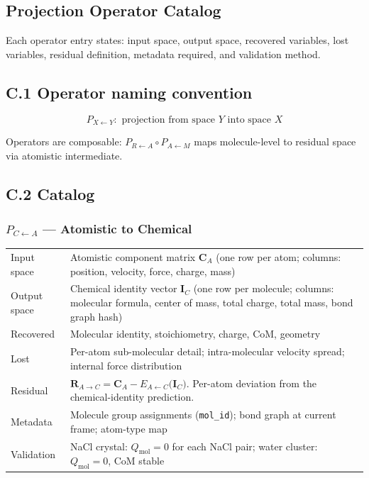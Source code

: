\documentclass[11pt, a4paper, oneside]{article}
\newcommand{\Comp}[1]{\mathbf{C}_{#1}}
\newcommand{\Ident}[1]{\mathbf{I}_{#1}}
\newcommand{\Resid}[1]{\mathbf{R}_{#1}}
\newcommand{\Embed}[2]{E_{#2 \leftarrow #1}}
\begin{document}
\begin{appendices}
\section{Projection Operator Catalog}
\label{app:C}

Each operator entry states: input space, output space, recovered variables,
lost variables, residual definition, metadata required, and validation method.

\subsection*{C.1 Operator naming convention}

\[
  P_{X \leftarrow Y}: \text{ projection from space } Y \text{ into space } X
\]

Operators are composable:
$P_{R \leftarrow A} \circ P_{A \leftarrow M}$ maps molecule-level to
residual space via atomistic intermediate.

\subsection*{C.2 Catalog}

\subsubsection*{$P_{C \leftarrow A}$ --- Atomistic to Chemical}

\begin{tabularx}{\linewidth}{l X}
  \toprule
  Input space & Atomistic component matrix $\Comp{A}$
	(one row per atom; columns: position, velocity, force,
	charge, mass) \\
  Output space & Chemical identity vector $\Ident{C}$
	(one row per molecule; columns: molecular formula,
	center of mass, total charge, total mass, bond graph hash) \\
  Recovered & Molecular identity, stoichiometry, charge, CoM, geometry \\
  Lost & Per-atom sub-molecular detail; intra-molecular
	velocity spread; internal force distribution \\
  Residual & $\Resid{A \to C} = \Comp{A}
	- \Embed{C}{A}\!\bigl(\Ident{C}\bigr)$. Per-atom deviation
	from the chemical-identity prediction. \\
  Metadata & Molecule group assignments (\texttt{mol\_id});
	bond graph at current frame; atom-type map \\
  Validation & NaCl crystal: $Q_\text{mol} = 0$ for each NaCl pair;
	water cluster: $Q_\text{mol} = 0$, CoM stable \\
  \bottomrule
\end{tabularx}


\end{appendices}
\end{document}
